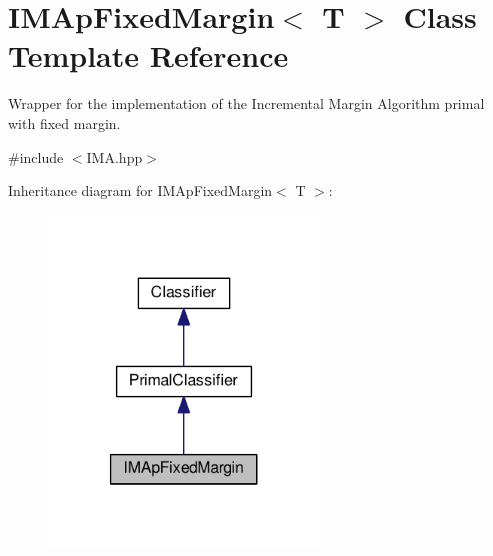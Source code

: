 \hypertarget{class_i_m_ap_fixed_margin}{}\section{I\+M\+Ap\+Fixed\+Margin$<$ T $>$ Class Template Reference}
\label{class_i_m_ap_fixed_margin}


Wrapper for the implementation of the Incremental Margin Algorithm primal with fixed margin.  




{\ttfamily \#include $<$I\+M\+A.\+hpp$>$}



Inheritance diagram for I\+M\+Ap\+Fixed\+Margin$<$ T $>$\+:
\nopagebreak
\begin{figure}[H]
\begin{center}
\leavevmode
\includegraphics[width=204pt]{class_i_m_ap_fixed_margin__inherit__graph}
\end{center}
\end{figure}


